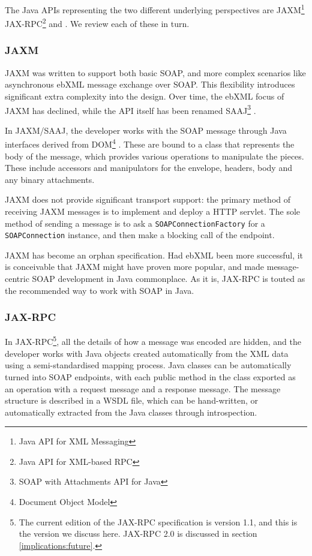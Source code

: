 The Java APIs representing the two different underlying perspectives
are JAXM\footnote{Java API for XML Messaging}
\cite{spec:JAX-M-11} JAX-RPC\footnote{Java API for XML-based RPC} and
\cite{spec:JAX-RPC-11}. We review each of these in turn.

\subsubsection{JAXM}
\label{intro:jaxm}

JAXM was written to support both basic SOAP, and more complex
scenarios like asynchronous ebXML message exchange over SOAP. This
flexibility introduces significant extra complexity into the design.
Over time, the ebXML focus of JAXM has declined, while the API itself
has been renamed SAAJ\footnote{SOAP with Attachments API for Java}
\cite{spec:SAAJ-12}.

In JAXM/SAAJ, the developer works with the SOAP message through Java
interfaces derived from DOM\footnote{Document Object Model}
\cite{spec:DOM}. These are bound to a class that represents the body
of the message, which provides various operations to manipulate the
pieces. These include accessors and manipulators for the envelope,
headers, body and any binary attachments.

JAXM does not provide significant transport support: the primary
method of receiving JAXM messages is to implement and deploy a HTTP
servlet.  The sole method of sending a message is to ask a
{\tt SOAPConnectionFactory} for a {\tt SOAPConnection} instance, and
then make a blocking call of the endpoint.

JAXM has become an orphan specification. Had ebXML been more
successful, it is conceivable that JAXM might have proven more
popular, and made message-centric SOAP development in Java
commonplace. As it is, JAX-RPC is touted as the recommended way to
work with SOAP in Java.

\subsubsection{JAX-RPC}
\label{intro:jax-rpc}

In JAX-RPC\footnote{The current edition of the JAX-RPC specification
is version 1.1, and this is the version we discuss here. JAX-RPC 2.0
is discussed in section \ref{implications:future}.}, all the details of
how a message was encoded are hidden, and the developer works with
Java objects created automatically from the XML data using a
semi-standardised mapping process. Java classes can be automatically
turned into SOAP endpoints, with each public method in the class
exported as an operation with a request message and a response
message. The message structure is described in a WSDL file, which can
be hand-written, or automatically extracted from the Java classes
through introspection.

